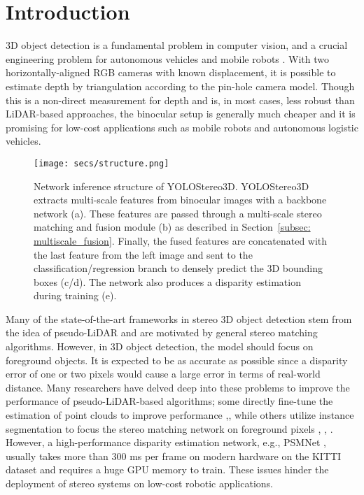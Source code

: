 \documentclass[letterpaper, 10 pt, conference]{ieeeconf}
\begin{document}
\section{Introduction}
\label{section:Introduction}
3D object detection is a fundamental problem in computer vision, and a crucial engineering problem for autonomous vehicles and mobile robots \cite{yang18HDNet_CORL} \cite{Zhou2019CORL}. 
With two horizontally-aligned RGB cameras with known displacement, it is possible to estimate depth by triangulation according to the pin-hole camera model.
Though this is a non-direct measurement for depth and is, in most cases, less robust than LiDAR-based approaches, the binocular setup is generally much cheaper and it is promising for low-cost applications such as mobile robots and autonomous logistic vehicles.
\begin{figure*}
    \centering
    \texttt{[image: secs/structure.png]}
        
    \caption{Network inference structure of YOLOStereo3D.
    YOLOStereo3D extracts multi-scale features from binocular images with a backbone network (a). 
    These features are passed through a multi-scale stereo matching and fusion module (b) as described in Section~\ref{subsec: multiscale_fusion}.
    Finally, the fused features are concatenated with the last feature from the left image and sent to the classification/regression branch to densely predict the 3D bounding boxes (c/d).
    The network also produces a disparity estimation during training (e).
   }
    \label{fig:architecture}
\end{figure*} 
Many of the state-of-the-art frameworks in stereo 3D object detection stem from the idea of pseudo-LiDAR and are motivated by general stereo matching algorithms.
However, in 3D object detection, the model should focus on foreground objects. It is expected to be as accurate as possible since a disparity error of one or two pixels would cause a large error in terms of real-world distance.
Many researchers have delved deep into these problems to improve the performance of pseudo-LiDAR-based algorithms; some directly fine-tune the estimation of point clouds to improve performance \cite{You2019PLPP},\cite{Qian2020PLE2E}, while others utilize instance segmentation to focus the stereo matching network on foreground pixels \cite{Sun2020DispRCNN}, \cite{xu2020Zoomnet}, \cite{Pon2019OCStereo}.
However, a high-performance disparity estimation network, e.g., PSMNet \cite{Chang2018PSMNet}, usually takes more than 300 ms per frame on modern hardware on the KITTI dataset \cite{Geiger2012KITTI} and requires a huge GPU memory to train.
These issues hinder the deployment of stereo systems on low-cost robotic applications.
\end{document}
